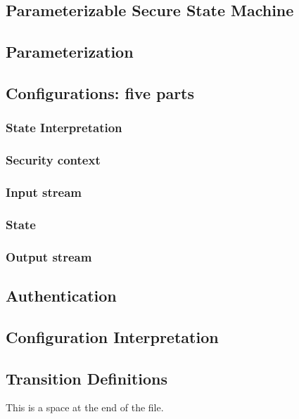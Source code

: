 \documentclass[../../main/main.tex]{subfiles}
\begin{document}
\subsection{Parameterizable Secure State Machine}
\subsection{Parameterization}

\subsection{Configurations: five parts}

\subsubsection{State Interpretation}
\subsubsection{Security context}
\subsubsection{Input stream}
\subsubsection{State}
\subsubsection{Output stream}


\subsection{Authentication}
\subsection{Configuration Interpretation}
\subsection{Transition Definitions}




\par
This is a space at the end of the file.
\end{document}

